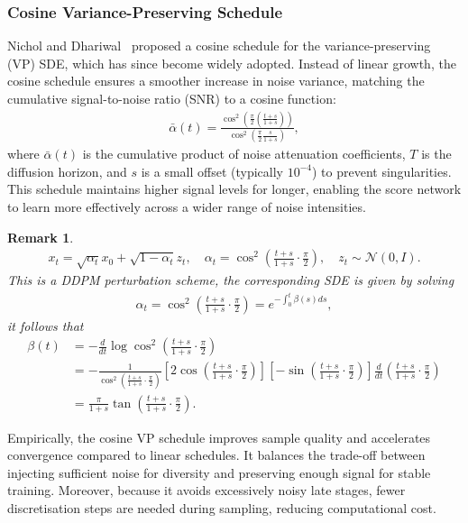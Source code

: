 \documentclass[a4paper,12pt]{article}
\newtheorem{remark}{Remark}[section]
\begin{document}
\subsubsection*{Cosine Variance-Preserving Schedule}
Nichol and Dhariwal~\cite{nicholImprovedDenoisingDiffusion2021} proposed a cosine schedule for the variance-preserving (VP) SDE, which has since become widely adopted. 
Instead of linear growth, the cosine schedule ensures a smoother increase in noise variance, matching the cumulative signal-to-noise ratio (SNR) to a cosine function:
\begin{align*}
    \bar \alpha(t) = \frac{\cos^2\!\left(\frac{\pi}{2}(\frac{t+s}{1+s})\right)}{\cos^2\!\left(\frac{\pi}{2}\frac{s}{1+s}\right)},
\end{align*}
where \(\bar \alpha(t)\) is the cumulative product of noise attenuation coefficients, \(T\) is the diffusion horizon, and \(s\) is a small offset (typically \(10^{-4}\)) to prevent singularities. This schedule maintains higher signal levels for longer, enabling the score network to learn more effectively across a wider range of noise intensities.
\begin{remark}
    \begin{align*}
        x_t=\sqrt{\alpha_t}x_0+\sqrt{1-\alpha_t}z_t,\quad\alpha_t=\cos^2\left(\frac{t+s}{1+s}\cdot\frac{\pi}{2}\right),\quad z_t\sim\mathcal{N}\left(0, I\right).
    \end{align*}
    This is a DDPM perturbation scheme, the corresponding SDE is given by solving
    \begin{align*}
        \alpha_t=\cos^2\left(\frac{t+s}{1+s}\cdot\frac{\pi}{2}\right)=e^{-\int_0^t\beta(s)ds},
    \end{align*}
    it follows that
    \begin{align*}
        \beta(t)
        &=-\frac{d}{dt}\log\cos^2\left(\frac{t+s}{1+s}\cdot\frac{\pi}{2}\right)\\
        &=-\frac{1}{\cos^2\left(\frac{t+s}{1+s}\cdot\frac{\pi}{2}\right)}\left[2\cos\left(\frac{t+s}{1+s}\cdot\frac{\pi}{2}\right)\right]\left[-\sin\left(\frac{t+s}{1+s}\cdot\frac{\pi}{2}\right)\right]\frac{d}{dt}\left(\frac{t+s}{1+s}\cdot\frac{\pi}{2}\right)\\
        &=\frac{\pi}{1+s}\tan\left(\frac{t+s}{1+s}\cdot\frac{\pi}{2}\right).
    \end{align*}
\end{remark}
Empirically, the cosine VP schedule improves sample quality and accelerates convergence compared to linear schedules. It balances the trade-off between injecting sufficient noise for diversity and preserving enough signal for stable training. Moreover, because it avoids excessively noisy late stages, fewer discretisation steps are needed during sampling, reducing computational cost.
\end{document}
